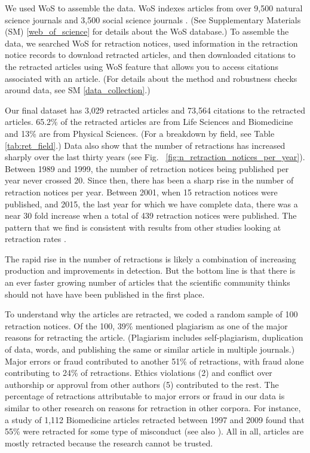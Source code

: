 \documentclass[12pt]{article}
\begin{document}
We used WoS to assemble the data. WoS indexes articles from over 9,500 natural science journals and 3,500 social science journals \cite{yong2013web}. (See Supplementary Materials (SM) \ref{web_of_science} for details about the WoS database.) To assemble the data, we searched WoS for retraction notices, used information in the retraction notice records to download retracted articles, and then downloaded citations to the retracted articles using WoS feature that allows you to access citations associated with an article. (For details about the method and robustness checks around data, see SM \ref{data_collection}.) 

Our final dataset has 3,029 retracted articles and 73,564 citations to the retracted articles. 65.2\% of the retracted articles are from Life Sciences and Biomedicine and 13\% are from Physical Sciences. (For a breakdown by field, see Table \ref{tab:ret_field}.) Data also show that the number of retractions has increased sharply over the last thirty years (see Fig. ~\ref{fig:n_retraction_notices_per_year}). Between 1989 and 1999, the number of retraction notices being published per year never crossed 20. Since then, there has been a sharp rise in the number of retraction notices per year. Between 2001, when 15 retraction notices were published, and 2015, the last year for which we have complete data, there was a near 30 fold increase when a total of 439 retraction notices were published. The pattern that we find is consistent with results from other studies looking at retraction rates \cite{steen2013has}.

The rapid rise in the number of retractions is likely a combination of increasing production and improvements in detection. But the bottom line is that there is an ever faster growing number of articles that the scientific community thinks should not have have been published in the first place. 

To understand why the articles are retracted, we coded a random sample of 100 retraction notices. Of the 100, 39\% mentioned plagiarism as one of the major reasons for retracting the article. (Plagiarism includes self-plagiarism, duplication of data, words, and publishing the same or similar article in multiple journals.) Major errors or fraud contributed to another 51\% of retractions, with fraud alone contributing to 24\% of retractions. Ethics violations (2) and conflict over authorship or approval from other authors (5) contributed to the rest. The percentage of retractions attributable to major errors or fraud in our data is similar to other research on reasons for retraction in other corpora. For instance, a study of 1,112 Biomedicine articles retracted between 1997 and 2009 found that 55\% were retracted for some type of misconduct \cite{budd2011retracted} (see also \cite{steen2010retractions}). All in all, articles are mostly retracted because the research cannot be trusted.
\end{document}
